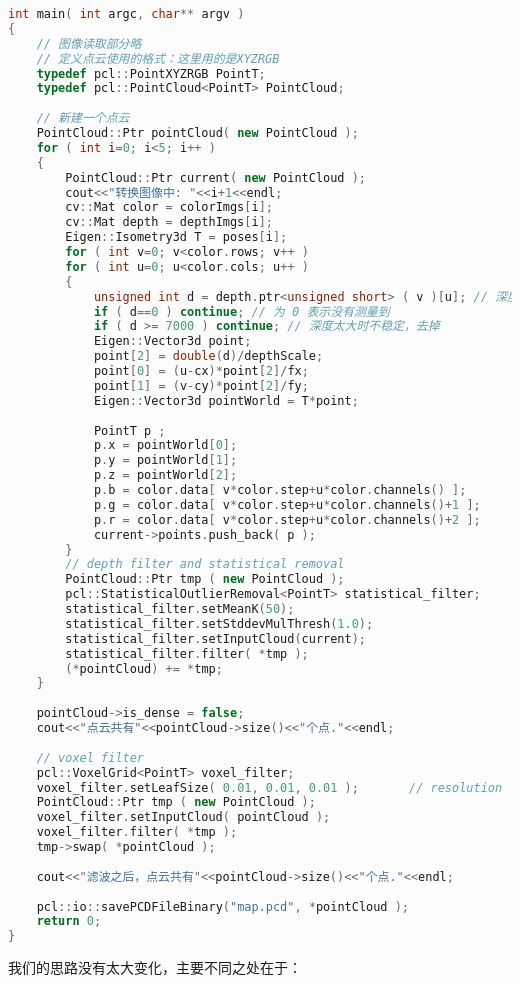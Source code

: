 \begin{lstlisting}[language=c++,caption=slambook/ch13/dense\_RGBD/pointcloud\_mapping.cpp（片段）]
int main( int argc, char** argv )
{
	// 图像读取部分略
	// 定义点云使用的格式：这里用的是XYZRGB
	typedef pcl::PointXYZRGB PointT; 
	typedef pcl::PointCloud<PointT> PointCloud;
	
	// 新建一个点云
	PointCloud::Ptr pointCloud( new PointCloud ); 
	for ( int i=0; i<5; i++ )
	{
		PointCloud::Ptr current( new PointCloud );
		cout<<"转换图像中: "<<i+1<<endl; 
		cv::Mat color = colorImgs[i]; 
		cv::Mat depth = depthImgs[i];
		Eigen::Isometry3d T = poses[i];
		for ( int v=0; v<color.rows; v++ )
		for ( int u=0; u<color.cols; u++ )
		{
			unsigned int d = depth.ptr<unsigned short> ( v )[u]; // 深度值
			if ( d==0 ) continue; // 为 0 表示没有测量到
			if ( d >= 7000 ) continue; // 深度太大时不稳定，去掉
			Eigen::Vector3d point; 
			point[2] = double(d)/depthScale; 
			point[0] = (u-cx)*point[2]/fx;
			point[1] = (v-cy)*point[2]/fy; 
			Eigen::Vector3d pointWorld = T*point;
			
			PointT p ;
			p.x = pointWorld[0];
			p.y = pointWorld[1];
			p.z = pointWorld[2];
			p.b = color.data[ v*color.step+u*color.channels() ];
			p.g = color.data[ v*color.step+u*color.channels()+1 ];
			p.r = color.data[ v*color.step+u*color.channels()+2 ];
			current->points.push_back( p );
		}
		// depth filter and statistical removal 
		PointCloud::Ptr tmp ( new PointCloud );
		pcl::StatisticalOutlierRemoval<PointT> statistical_filter;
		statistical_filter.setMeanK(50);
		statistical_filter.setStddevMulThresh(1.0);
		statistical_filter.setInputCloud(current);
		statistical_filter.filter( *tmp );
		(*pointCloud) += *tmp;
	}
	
	pointCloud->is_dense = false;
	cout<<"点云共有"<<pointCloud->size()<<"个点."<<endl;
	
	// voxel filter 
	pcl::VoxelGrid<PointT> voxel_filter; 
	voxel_filter.setLeafSize( 0.01, 0.01, 0.01 );       // resolution 
	PointCloud::Ptr tmp ( new PointCloud );
	voxel_filter.setInputCloud( pointCloud );
	voxel_filter.filter( *tmp );
	tmp->swap( *pointCloud );
	
	cout<<"滤波之后，点云共有"<<pointCloud->size()<<"个点."<<endl;
	
	pcl::io::savePCDFileBinary("map.pcd", *pointCloud );
	return 0;
}
\end{lstlisting}

\clearpage
我们的思路没有太大变化，主要不同之处在于：

